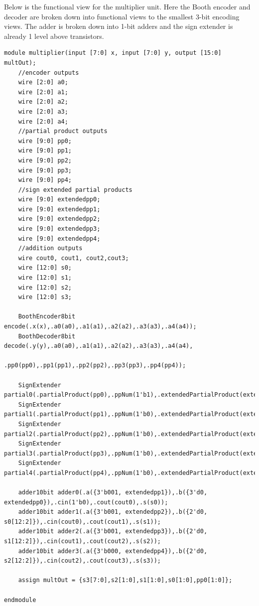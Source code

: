 \documentclass{memo}
\begin{document}
Below is the functional view for the multiplier unit. Here the Booth encoder and decoder are broken down into functional views to the smallest 3-bit encoding views. The adder is broken down into 1-bit adders and the sign extender is already 1 level above transistors.
\begin{lstlisting}
module multiplier(input [7:0] x, input [7:0] y, output [15:0] multOut);
    //encoder outputs
    wire [2:0] a0;
    wire [2:0] a1;
    wire [2:0] a2;
    wire [2:0] a3;
    wire [2:0] a4;
    //partial product outputs
    wire [9:0] pp0;
    wire [9:0] pp1;
    wire [9:0] pp2;
    wire [9:0] pp3;
    wire [9:0] pp4;
    //sign extended partial products
    wire [9:0] extendedpp0;
    wire [9:0] extendedpp1;
    wire [9:0] extendedpp2;
    wire [9:0] extendedpp3;
    wire [9:0] extendedpp4;
    //addition outputs
    wire cout0, cout1, cout2,cout3;
    wire [12:0] s0;
    wire [12:0] s1;
    wire [12:0] s2;
    wire [12:0] s3;

    BoothEncoder8bit encode(.x(x),.a0(a0),.a1(a1),.a2(a2),.a3(a3),.a4(a4));
    BoothDecoder8bit decode(.y(y),.a0(a0),.a1(a1),.a2(a2),.a3(a3),.a4(a4),
                            .pp0(pp0),.pp1(pp1),.pp2(pp2),.pp3(pp3),.pp4(pp4));

    SignExtender partial0(.partialProduct(pp0),.ppNum(1'b1),.extendedPartialProduct(extendedpp0));
    SignExtender partial1(.partialProduct(pp1),.ppNum(1'b0),.extendedPartialProduct(extendedpp1));
    SignExtender partial2(.partialProduct(pp2),.ppNum(1'b0),.extendedPartialProduct(extendedpp2));
    SignExtender partial3(.partialProduct(pp3),.ppNum(1'b0),.extendedPartialProduct(extendedpp3));
    SignExtender partial4(.partialProduct(pp4),.ppNum(1'b0),.extendedPartialProduct(extendedpp4));

    adder10bit adder0(.a({3'b001, extendedpp1}),.b({3'd0, extendedpp0}),.cin(1'b0),.cout(cout0),.s(s0));
    adder10bit adder1(.a({3'b001, extendedpp2}),.b({2'd0, s0[12:2]}),.cin(cout0),.cout(cout1),.s(s1));
    adder10bit adder2(.a({3'b001, extendedpp3}),.b({2'd0, s1[12:2]}),.cin(cout1),.cout(cout2),.s(s2));
    adder10bit adder3(.a({3'b000, extendedpp4}),.b({2'd0, s2[12:2]}),.cin(cout2),.cout(cout3),.s(s3));

    assign multOut = {s3[7:0],s2[1:0],s1[1:0],s0[1:0],pp0[1:0]};

endmodule
\end{lstlisting}
\end{document}
